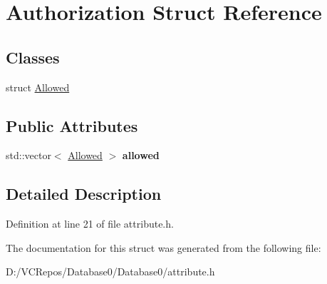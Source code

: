 \hypertarget{struct_authorization}{}\section{Authorization Struct Reference}
\label{struct_authorization}
\subsection*{Classes}
\begin{DoxyCompactItemize}
\item 
struct \mbox{\hyperlink{struct_authorization_1_1_allowed}{Allowed}}
\end{DoxyCompactItemize}
\subsection*{Public Attributes}
\begin{DoxyCompactItemize}
\item 
\mbox{\label{struct_authorization_a9334b13832cb272f104119455f0852bf}} 
std\+::vector$<$ \mbox{\hyperlink{struct_authorization_1_1_allowed}{Allowed}} $>$ {\bfseries allowed}
\end{DoxyCompactItemize}


\subsection{Detailed Description}


Definition at line 21 of file attribute.\+h.



The documentation for this struct was generated from the following file\+:\begin{DoxyCompactItemize}
\item 
D\+:/\+V\+C\+Repos/\+Database0/\+Database0/attribute.\+h\end{DoxyCompactItemize}
